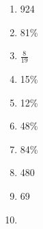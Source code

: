 \documentclass[../uilmath.tex]{subfiles}
\begin{document}
\begin{enumerate}[label=\bfseries\arabic*.]
    \item %
    924

    \item %
    81\%

    \item %
    $\frac{8}{19}$

    \item %
    15\%

    \item %
    12\%

    \item %
    48\%

    \item %
    84\%

    \item %
    480

    \item %
    69

    \item %
    
\end{enumerate}
\end{document}
